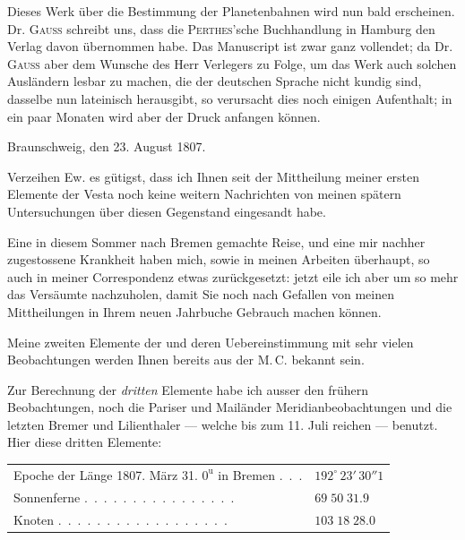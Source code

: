 \expandafter\def\csname HistoricalNoteText27\endcsname{Dieses Werk über die Bestimmung der Planetenbahnen wird nun bald erscheinen. Dr. \textsc{Gauss} schreibt uns, dass die \textsc{Perthes}'sche Buchhandlung in Hamburg den Verlag davon übernommen habe. Das Manuscript ist zwar ganz vollendet; da Dr. \textsc{Gauss} aber dem Wunsche des Herr Verlegers zu Folge, um das Werk auch solchen Ausländern lesbar zu machen, die der deutschen Sprache nicht kundig sind, dasselbe nun lateinisch herausgibt, so verursacht dies noch einigen Aufenthalt; in ein paar Monaten wird aber der Druck anfangen können.}
\clearpage
{}
\hypertarget{native-289-lower}{}
\begin{flushright}
Braunschweig, den 23. August 1807.
\end{flushright}

\par\indent Verzeihen Ew. es gütigst, dass ich Ihnen seit der Mittheilung meiner ersten Elemente der Vesta
noch keine weitern Nachrichten von meinen spätern Untersuchungen über diesen Gegenstand eingesandt habe.
%
\par\indent Eine in diesem Sommer nach Bremen gemachte Reise, und eine mir nachher zugestossene Krankheit haben mich, sowie in meinen Arbeiten überhaupt, so auch in meiner Correspondenz etwas zurückgesetzt: jetzt eile ich aber um so mehr das Versäumte nachzuholen, damit Sie noch nach Gefallen von meinen Mittheilungen in Ihrem neuen Jahrbuche Gebrauch machen können.

\par\indent Meine zweiten Elemente der \VestaBodyTwoNinety{} und deren Uebereinstimmung mit sehr vielen Beobachtungen werden Ihnen bereits aus der M.\,C. bekannt sein.

\par\indent Zur Berechnung der \emph{dritten} Elemente habe ich ausser den frühern Beobachtungen, noch die Pariser und Mailänder Meridianbeobachtungen und die letzten Bremer und Lilienthaler --- welche bis zum 11. Juli reichen --- benutzt. Hier diese dritten Elemente:

\begin{center}\begingroup\fontsize{9}{11}\selectfont
\begin{tabular}{ll}
\shortstack[l]{Epoche der Länge 1807. März 31.\\$0^{\text{u}}$ in Bremen} .\ .\ . & $192^\circ\,23'\,30''1$ \\
Sonnenferne .\ .\ .\ .\ .\ .\ .\ .\ .\ .\ .\ .\ .\ .\ .\ . & $69\;50\;31.9$ \\
Knoten .\ .\ .\ .\ .\ .\ .\ .\ .\ .\ .\ .\ .\ .\ .\ .\ .\ . & $103\;18\;28.0$
\end{tabular}\endgroup\end{center}


